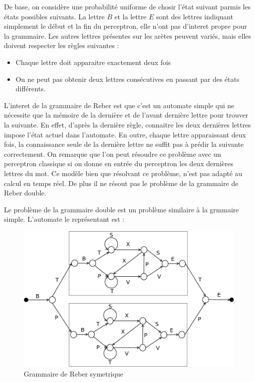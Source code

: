  
De base, on considère une probabilité uniforme de chosir l'état suivant parmis les états possibles suivants. La lettre $B$ et la lettre $E$ sont des lettres indiquant simplement le début et la fin du perceptron, elle n'ont pas d'interet propre pour la grammaire. Les autres lettres présentes sur les arètes peuvent variés, mais elles doivent respecter les règles suivantes :
\medskip
\begin{itemize}
	\item Chaque lettre doit apparaitre exactement deux fois
	\item On ne peut pas obtenir deux lettres consécutives en passant par des états différents.
\end{itemize}

\vspace{\parskip}
L'interet de la grammaire de Reber est que c'est un automate simple qui ne nécessite que la mémoire de la dernière et de l'avant dernière lettre pour trouver la suivante. En effet, d'après la dernière règle, connaitre les deux dernières lettres impose l'état actuel dans l'automate. En outre, chaque lettre apparaissant deux fois, la connaissance seule de la dernière lettre ne suffit pas à prédir la suivante correctement. On remarque que l'on peut résoudre ce problème avec un perceptron classique si on donne en entrée du perceptron les deux dernières lettres du mot. Ce modèle bien que résolvant ce problème, n'est pas adapté au calcul en temps réel. De plus il ne résout pas le problème de la grammaire de Reber double.

Le problème de la grammaire double est un problème similaire à la grmmaire simple. L'automate le représentant est :

\begin{figure}[!ht]
\begin{center}
\includegraphics[scale=0.4]{rtrl/reberGrammarSymmetric.png}
\end{center}
\caption{Grammaire de Reber symetrique}
\end{figure}

